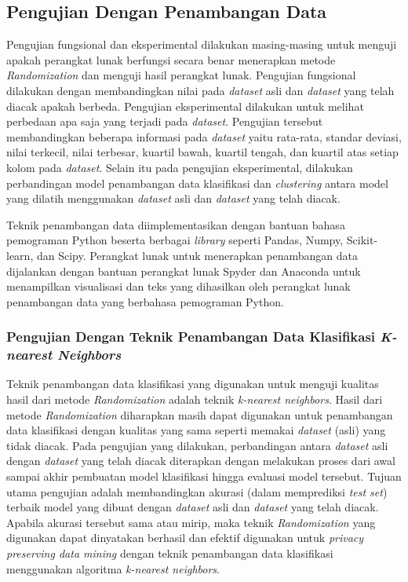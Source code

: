\subsection{Pengujian Dengan Penambangan Data}
\label{subsec:analisis-penambangan}

Pengujian fungsional dan eksperimental dilakukan masing-masing untuk menguji apakah perangkat lunak berfungsi secara benar menerapkan metode \textit{Randomization} dan menguji hasil perangkat lunak. Pengujian fungsional dilakukan dengan membandingkan nilai pada \textit{dataset} asli dan \textit{dataset} yang telah diacak apakah berbeda. Pengujian eksperimental dilakukan untuk melihat perbedaan apa saja yang terjadi pada \textit{dataset}. Pengujian tersebut membandingkan beberapa informasi pada \textit{dataset} yaitu rata-rata, standar deviasi, nilai terkecil, nilai terbesar, kuartil bawah, kuartil tengah, dan kuartil atas setiap kolom pada \textit{dataset}. Selain itu pada pengujian eksperimental, dilakukan perbandingan model penambangan data klasifikasi dan \textit{clustering} antara model yang dilatih menggunakan \textit{dataset} asli dan \textit{dataset} yang telah diacak.

Teknik penambangan data diimplementasikan dengan bantuan bahasa pemograman Python beserta berbagai \textit{library} seperti Pandas, Numpy, Scikit-learn, dan Scipy. Perangkat lunak untuk menerapkan penambangan data dijalankan dengan bantuan perangkat lunak Spyder dan Anaconda untuk menampilkan visualisasi dan teks yang dihasilkan oleh perangkat lunak penambangan data yang berbahasa pemograman Python. 

\subsubsection{Pengujian Dengan Teknik Penambangan Data Klasifikasi \textit{K-nearest Neighbors}}
\label{subsubsec:analisis-knn}

Teknik penambangan data klasifikasi yang digunakan untuk menguji kualitas hasil dari metode \textit{Randomization} adalah teknik \textit{k-nearest neighbors}. Hasil dari metode \textit{Randomization} diharapkan masih dapat digunakan untuk penambangan data klasifikasi dengan kualitas yang sama seperti memakai \textit{dataset} (asli) yang tidak diacak. Pada pengujian yang dilakukan, perbandingan antara \textit{dataset} asli dengan \textit{dataset} yang telah diacak diterapkan dengan melakukan proses dari awal sampai akhir pembuatan model klasifikasi hingga evaluasi model tersebut. Tujuan utama pengujian adalah membandingkan akurasi (dalam memprediksi \textit{test set}) terbaik model yang dibuat dengan \textit{dataset} asli dan \textit{dataset} yang telah diacak. Apabila akurasi tersebut sama atau mirip, maka teknik \textit{Randomization} yang digunakan dapat dinyatakan berhasil dan efektif digunakan untuk \textit{privacy preserving data mining} dengan teknik penambangan data klasifikasi menggunakan algoritma \textit{k-nearest neighbors}.


